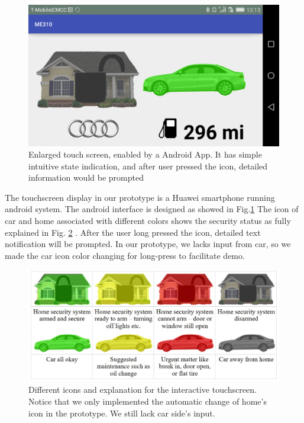 \begin{figure}[ht]
\label{Fig.AndroidInterface}
\centering
	\includegraphics[keepaspectratio, width=5in]{Figures/Specifications/AndriodApp.png}
	\caption{Enlarged touch screen, enabled by a Android App. It has simple intuitive state indication, and after user pressed the icon, detailed information would be prompted}
\end{figure}

The touchscreen display in our prototype is a Huawei smartphone running android system. The android interface is designed as showed in Fig.\ref{Fig.AndroidInterface} The icon of car and home associated with different colors shows the security status as fully explained in Fig. \ref{Fig.Icons} . After the user long pressed the icon, detailed text notification will be prompted. In our prototype, we lacks input from car, so we made the car icon color changing for long-press to facilitate demo.

\begin{figure}[ht]
\label{Fig.Icons}
\centering
	\includegraphics[keepaspectratio, width=5in]{Figures/Specifications/Icons.jpg}
	\caption{Different icons and explanation for the interactive touchscreen. Notice that we only implemented the automatic change of home's icon in the prototype. We still lack car side's input.}
\end{figure}

